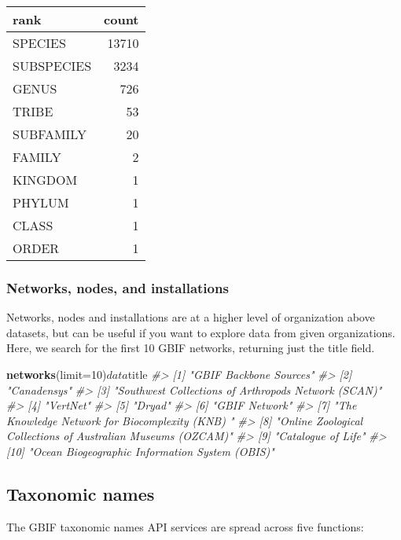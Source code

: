 \documentclass[author-year, review, 11pt]{components/elsarticle} %
\newenvironment{Shaded}{\begin{snugshade}}{\end{snugshade}}
\newcommand{\KeywordTok}[1]{\textcolor[rgb]{0.13,0.29,0.53}{\textbf{{#1}}}}
\newcommand{\DataTypeTok}[1]{\textcolor[rgb]{0.13,0.29,0.53}{{#1}}}
\newcommand{\DecValTok}[1]{\textcolor[rgb]{0.00,0.00,0.81}{{#1}}}
\newcommand{\CommentTok}[1]{\textcolor[rgb]{0.56,0.35,0.01}{\textit{{#1}}}}
\newcommand{\NormalTok}[1]{{#1}}
\begin{document}
\begin{longtable}[c]{@{}lr@{}}
\toprule
rank & count\tabularnewline
\midrule
\endhead
SPECIES & 13710\tabularnewline
SUBSPECIES & 3234\tabularnewline
GENUS & 726\tabularnewline
TRIBE & 53\tabularnewline
SUBFAMILY & 20\tabularnewline
FAMILY & 2\tabularnewline
KINGDOM & 1\tabularnewline
PHYLUM & 1\tabularnewline
CLASS & 1\tabularnewline
ORDER & 1\tabularnewline
\bottomrule
\end{longtable}

\subsubsection{Networks, nodes, and
installations}\label{networks-nodes-and-installations}

Networks, nodes and installations are at a higher level of organization
above datasets, but can be useful if you want to explore data from given
organizations. Here, we search for the first 10 GBIF networks, returning
just the title field.

\begin{Shaded}
\begin{Highlighting}[]
\KeywordTok{networks}\NormalTok{(}\DataTypeTok{limit=}\DecValTok{10}\NormalTok{)$data$title}
\CommentTok{#>  [1] "GBIF Backbone Sources"                                      }
\CommentTok{#>  [2] "Canadensys"                                                 }
\CommentTok{#>  [3] "Southwest Collections of Arthropods Network (SCAN)"         }
\CommentTok{#>  [4] "VertNet"                                                    }
\CommentTok{#>  [5] "Dryad"                                                      }
\CommentTok{#>  [6] "GBIF Network"                                               }
\CommentTok{#>  [7] "The Knowledge Network for Biocomplexity (KNB) "             }
\CommentTok{#>  [8] "Online Zoological Collections of Australian Museums (OZCAM)"}
\CommentTok{#>  [9] "Catalogue of Life"                                          }
\CommentTok{#> [10] "Ocean Biogeographic Information System (OBIS)"}
\end{Highlighting}
\end{Shaded}

\subsection{Taxonomic names}\label{taxonomic-names}

The GBIF taxonomic names API services are spread across five functions:
\end{document}
